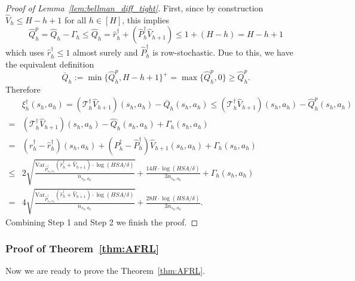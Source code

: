 \begin{proof}[Proof of Lemma~\ref{lem:bellman_diff_tight}]
	First, since by construction $\widehat{V}_h \leq H-h+1$ for all $h\in[H]$, this implies
	\[
	\widehat{Q}^p_h=\widehat{Q}_h-\Gamma_h\leq \widehat{Q}_h= \widehat{r}^\dagger_h+(\widehat{P}^\dagger_{h}\widehat{V}_{h+1})\leq 1+(H-h)=H-h+1
	\]
	which uses $ \widehat{r}^\dagger_h\leq 1$ almost surely and $\widehat{P}^\dagger_{h}$ is row-stochastic. Due to this, we have the equivalent definition 
	\[
	\overline{Q}_h:=\min\{\widehat{Q}^p_h,H-h+1\}^+=\max\{\widehat{Q}^p_h,0\}\geq \widehat{Q}^p_h.
	\]
	Therefore
	\begin{align*}
	&\xi^\dagger_h(s_h,a_h)=(\mathcal{T}^\dagger_h\widehat{V}_{h+1})(s_h,a_h)-\overline{Q}_h(s_h,a_h)\leq (\mathcal{T}^\dagger_h\widehat{V}_{h+1})(s_h,a_h)-\widehat{Q}^p_h(s_h,a_h)\\
	=&(\mathcal{T}^\dagger_h\widehat{V}_{h+1})(s_h,a_h)-\widehat{Q}_h(s_h,a_h)+\Gamma_h(s_h,a_h)\\
	=&(r^\dagger_h-\widehat{r}^\dagger_h)(s_h,a_h)+(P^\dagger_h-\widehat{P}^\dagger_h)\widehat{V}_{h+1}(s_h,a_h)+\Gamma_h(s_h,a_h)\\
	\leq &2\sqrt{\frac{\mathrm{Var}_{\widehat{P}^\dagger_{s_h,a_h}}(\widehat{r}^\dagger_h+\widehat{V}_{h+1})\cdot\log(HSA/\delta)}{n_{s_h,a_h}}}+\frac{14H\cdot\log(HSA/\delta)}{3n_{s_h,a_h}}+\Gamma_h(s_h,a_h)\\
	=&4\sqrt{\frac{\mathrm{Var}_{\widehat{P}^\dagger_{s_h,a_h}}(\widehat{r}^\dagger_h+\widehat{V}_{h+1})\cdot\log(HSA/\delta)}{n_{s_h,a_h}}}+\frac{28H\cdot\log(HSA/\delta)}{3n_{s_h,a_h}}.
	\end{align*}
	Combining Step 1 and Step 2 we finish the proof.
\end{proof}



\subsubsection{Proof of Theorem~\ref{thm:AFRL}}

Now we are ready to prove the Theorem~\ref{thm:AFRL}. 

